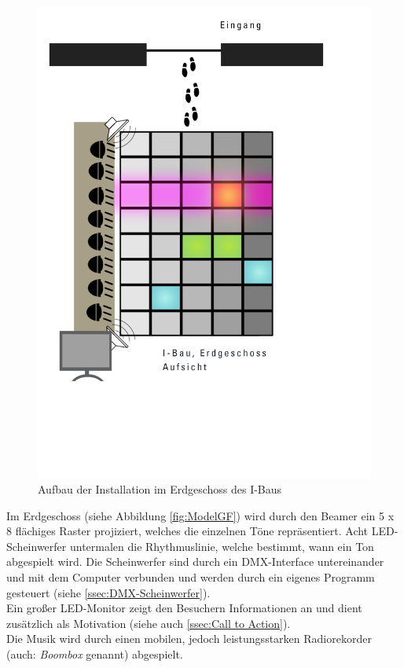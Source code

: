 \begin{figure}[htbp]
	\centering
		\includegraphics[width=1.0\textwidth]{images/ModelGroundFloor.png}
	\caption{Aufbau der Installation im Erdgeschoss des I-Baus}
	\label{fig:ModelGF}
\end{figure}

Im Erdgeschoss (siehe Abbildung \autoref{fig:ModelGF}) wird durch den Beamer ein 5 x 8 flächiges Raster projiziert, welches die einzelnen Töne repräsentiert. Acht LED-Scheinwerfer untermalen die Rhythmuslinie, welche bestimmt, wann ein Ton abgespielt wird. Die Scheinwerfer sind durch ein DMX-Interface untereinander und mit dem Computer verbunden und werden durch ein eigenes Programm gesteuert (siehe \autoref{ssec:DMX-Scheinwerfer}).\\
Ein großer LED-Monitor zeigt den Besuchern Informationen an und dient zusätzlich als Motivation (siehe auch \autoref{ssec:Call to Action}).\\
Die Musik wird durch einen mobilen, jedoch leistungsstarken Radiorekorder (auch: \textit{Boombox} genannt) abgespielt.